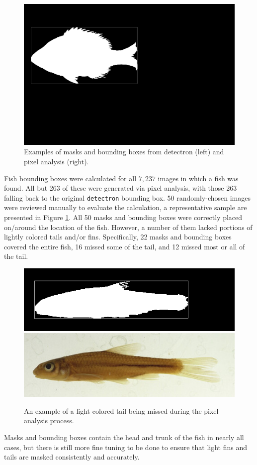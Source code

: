 \documentclass[conference]{IEEEtran}
\begin{document}
\begin{figure}[H]
  \includegraphics[width=0.49\linewidth]{images/56885_mask}
  \caption{Examples of masks and bounding boxes from detectron (left) and pixel analysis (right).}
  \label{fig:bbox_mask}
\end{figure}

Fish bounding boxes were calculated for all \(7,237\) images in which a fish was found. All but 263 of these were generated via pixel analysis, with those 263 falling back to the original \verb|detectron| bounding box.
50 randomly-chosen images were reviewed manually to evaluate the
calculation, a representative sample are presented in
Figure \ref{fig:bbox_mask}.
All 50 masks and bounding boxes were correctly placed
on/around the location of the fish. However, a number of them lacked portions of lightly colored tails and/or fins.
Specifically, 22 masks and bounding boxes covered the entire fish,
16 missed some of the tail, and 12 missed most or all of the tail.
\begin{figure}[H]
  \centering
  \includegraphics[width=0.49\linewidth]{images/61631}
  \includegraphics[width=0.49\linewidth]{images/61631_mask}
  \caption{An example of a light colored tail being missed during the pixel analysis process.}
\end{figure}
Masks and bounding boxes contain the head and trunk of the fish in nearly all cases, but there is still more fine tuning to be done to ensure that light fins and tails are masked consistently and accurately.
\end{document}
